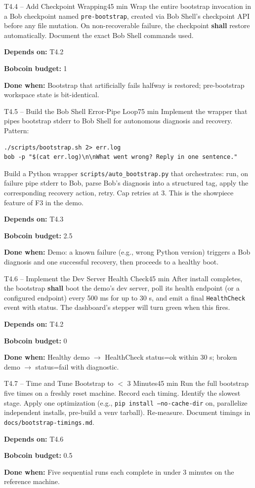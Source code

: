 \documentclass[11pt,letterpaper]{article}
\newcommand{\acceptance}[1]{\par\smallskip\textcolor{ibmgreen}{\textbf{Done when:}} #1}
\newcommand{\depends}[1]{\par\smallskip\textcolor{ibmorange}{\textbf{Depends on:}} #1}
\newcommand{\bobcost}[1]{\par\smallskip\textcolor{ibmaccent}{\textbf{Bobcoin budget:}} #1}
\newcommand{\shall}{\textbf{shall}}
\begin{document}
\begin{task}{T4.4 -- Add Checkpoint Wrapping}{45 min}
Wrap the entire bootstrap invocation in a Bob checkpoint named \texttt{pre-bootstrap}, created via Bob Shell's checkpoint API before any file mutation. On non-recoverable failure, the checkpoint \shall{} restore automatically. Document the exact Bob Shell commands used.
\depends{T4.2}
\bobcost{1}
\acceptance{Bootstrap that artificially fails halfway is restored; pre-bootstrap workspace state is bit-identical.}
\end{task}

\begin{task}{T4.5 -- Build the Bob Shell Error-Pipe Loop}{75 min}
Implement the wrapper that pipes bootstrap stderr to Bob Shell for autonomous diagnosis and recovery. Pattern:

\begin{lstlisting}
./scripts/bootstrap.sh 2> err.log
bob -p "$(cat err.log)\n\nWhat went wrong? Reply in one sentence."
\end{lstlisting}

Build a Python wrapper \texttt{scripts/auto\_bootstrap.py} that orchestrates: run, on failure pipe stderr to Bob, parse Bob's diagnosis into a structured tag, apply the corresponding recovery action, retry. Cap retries at 3. This is the showpiece feature of F3 in the demo.
\depends{T4.3}
\bobcost{2.5}
\acceptance{Demo: a known failure (e.g., wrong Python version) triggers a Bob diagnosis and one successful recovery, then proceeds to a healthy boot.}
\end{task}

\begin{task}{T4.6 -- Implement the Dev Server Health Check}{45 min}
After install completes, the bootstrap \shall{} boot the demo's dev server, poll its health endpoint (or a configured endpoint) every 500 ms for up to 30 s, and emit a final \texttt{HealthCheck} event with status. The dashboard's stepper will turn green when this fires.
\depends{T4.2}
\bobcost{0}
\acceptance{Healthy demo $\rightarrow$ HealthCheck status=ok within 30 s; broken demo $\rightarrow$ status=fail with diagnostic.}
\end{task}

\begin{task}{T4.7 -- Time and Tune Bootstrap to $<$ 3 Minutes}{45 min}
Run the full bootstrap five times on a freshly reset machine. Record each timing. Identify the slowest stage. Apply one optimization (e.g., \texttt{pip install --no-cache-dir} on, parallelize independent installs, pre-build a venv tarball). Re-measure. Document timings in \texttt{docs/bootstrap-timings.md}.
\depends{T4.6}
\bobcost{0.5}
\acceptance{Five sequential runs each complete in under 3 minutes on the reference machine.}
\end{task}
\end{document}
